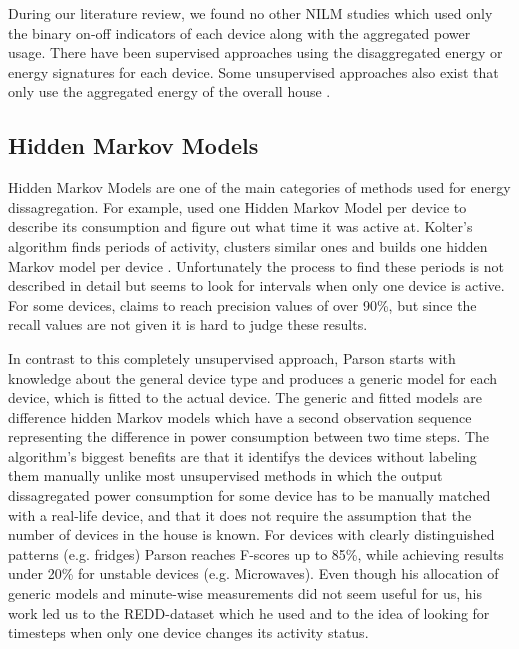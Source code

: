 \documentclass{article}
\begin{document}
During our literature review, we found no other NILM studies which used only the binary on-off indicators of each device along with the aggregated power usage.
There have been supervised approaches using the disaggregated energy\cite{Kelly} or energy signatures \cite{Parson} for each device.
Some unsupervised approaches also exist that only use the aggregated energy of the overall house \cite{Kolter}.

\subsection{Hidden Markov Models}
Hidden Markov Models are one of the main categories of methods used for energy dissagregation.
For example, \cite{Kolter} used one Hidden Markov Model per device to describe its consumption and figure out what time 
it was active at. Kolter's algorithm finds periods of activity, clusters similar ones and builds one hidden Markov model per device \cite{Kolter}. 
Unfortunately the process to find these periods is not described in detail but seems to look for intervals when only 
one device is active. For some devices, \cite{Kolter} claims to reach precision values of over 90\%, but since the recall values are not 
given it is hard to judge these results. 

In contrast to this completely unsupervised approach, Parson starts with knowledge about the general device type and 
produces a generic model for each device, which is fitted to the actual device. The generic and fitted models are difference hidden Markov models which have a second observation sequence representing the difference in power consumption between two time steps. The algorithm's biggest benefits are that it identifys the 
devices without labeling them manually unlike most unsupervised methods in which the output dissagregated power consumption for some device has to be manually matched with a real-life device, and that it does not require the assumption that the number of devices in the house is known. For devices with clearly distinguished patterns 
(e.g. fridges) Parson reaches F-scores up to 85\%, while achieving results under 20\% for unstable devices (e.g. Microwaves).
Even though his allocation of generic models and minute-wise measurements did not seem useful for us, his work led 
us to the REDD-dataset which he used
and to the idea of looking for timesteps when only one device changes its activity status.
\end{document}
